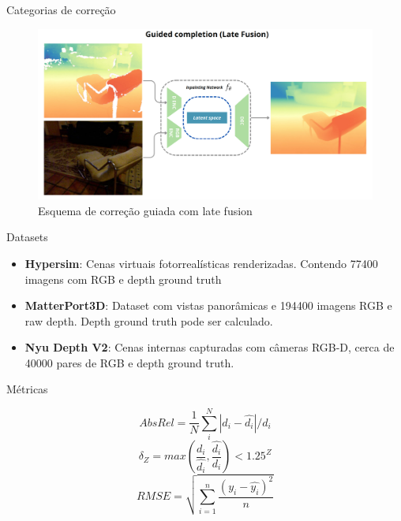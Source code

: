 \documentclass[aspectratio=169]{beamer}
\begin{document}
\begin{frame}{Categorias de correção}

\begin{figure}
    \centering
    \includegraphics[width=\textwidth]{figs/latefusion1.png}
    \caption{Esquema de correção guiada com late fusion}
    
\end{figure}
    
\end{frame}




\begin{frame}{Datasets}

\begin{itemize}
    \item \textbf{Hypersim}: Cenas virtuais fotorrealísticas renderizadas. Contendo 77400 imagens com RGB e depth ground truth 
    \item \textbf{MatterPort3D}: Dataset com vistas panorâmicas e 194400 imagens RGB e raw depth. Depth ground truth pode ser calculado. 
    \item \textbf{Nyu Depth V2}: Cenas internas capturadas com câmeras RGB-D, cerca de 40000 pares de RGB e depth ground truth.
\end{itemize}
    
\end{frame}




\begin{frame}{Métricas}

 
   $$ Abs Rel = \frac{1}{N} \sum_{i}^{N} \left |  d_i - \hat{d_i}\right | / \hat{d_i}$$
   $$ \delta_Z = max (\frac{d_i}{\hat{d_i}} , \frac{\hat{d_i}}{d_i}) < 1.25^Z $$
   $$ RMSE = \sqrt{\sum_{i=1}^{n}\frac{(y_i - \hat{y_i})^2}{n}}$$

\end{frame}
\end{document}

